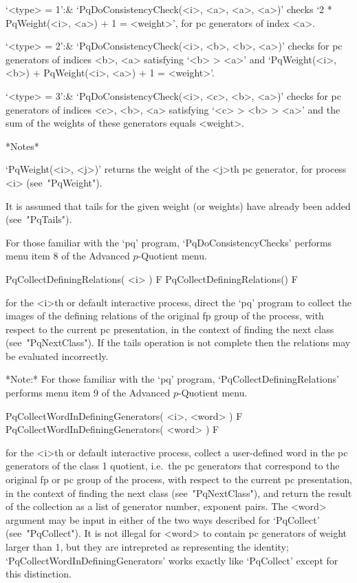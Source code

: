 \beginitems

`<type> = 1':&
`PqDoConsistencyCheck(<i>, <a>, <a>, <a>)' checks `2 * PqWeight(<i>, <a>)
+ 1 = <weight>', for pc generators of index <a>.

`<type> = 2':&
`PqDoConsistencyCheck(<i>, <b>, <b>, <a>)' checks for  pc  generators  of
indices <b>, <a>  satisfying  `<b>  >  <a>'  and  `PqWeight(<i>,  <b>)  +
PqWeight(<i>, <a>) + 1 = <weight>'.

`<type> = 3':&
`PqDoConsistencyCheck(<i>, <c>, <b>, <a>)' checks for  pc  generators  of
indices <c>, <b>, <a> satisfying `<c> > <b> > <a>' and  the  sum  of  the
weights of these generators equals <weight>.

\enditems

*Notes*

`PqWeight(<i>, <j>)' returns the weight of the <j>th  pc  generator,  for
process <i> (see~"PqWeight").

It is assumed that tails for the given weight (or weights)  have  already
been added (see~"PqTails").

For those familiar with the `pq' program, `PqDoConsistencyChecks' performs
menu item 8 of the Advanced $p$-Quotient menu.

\>PqCollectDefiningRelations( <i> ) F
\>PqCollectDefiningRelations() F

for the <i>th or default interactive {\ANUPQ} process,  direct  the  `pq'
program to collect the images of the defining relations of the original fp
group of the process, with respect to the current pc presentation, in the
context of finding the  next  class  (see~"PqNextClass").  If  the  tails
operation  is  not  complete  then  the  relations   may   be   evaluated
incorrectly.

*Note:*
For those familiar with  the  `pq'  program,  `PqCollectDefiningRelations'
performs menu item 9 of the Advanced $p$-Quotient menu.

\>PqCollectWordInDefiningGenerators( <i>, <word> ) F
\>PqCollectWordInDefiningGenerators( <word> ) F

for  the  <i>th  or  default  interactive  {\ANUPQ}  process,  collect  a
user-defined word in the pc generators of the class 1 quotient,  i.e.~the
pc generators that correspond to the original  fp  or  pc  group  of  the
process, with respect to the current pc presentation, in the  context  of
finding the next class (see~"PqNextClass"), and return the result of  the
collection as a list of generator  number,  exponent  pairs.  The  <word>
argument may be input in either of the two ways described for `PqCollect'
(see~"PqCollect"). It is not illegal for <word> to contain pc  generators
of weight larger than 1, but they are  intrepreted  as  representing  the
identity;   `PqCollectWordInDefiningGenerators'   works   exactly    like
`PqCollect' except for this distinction.

